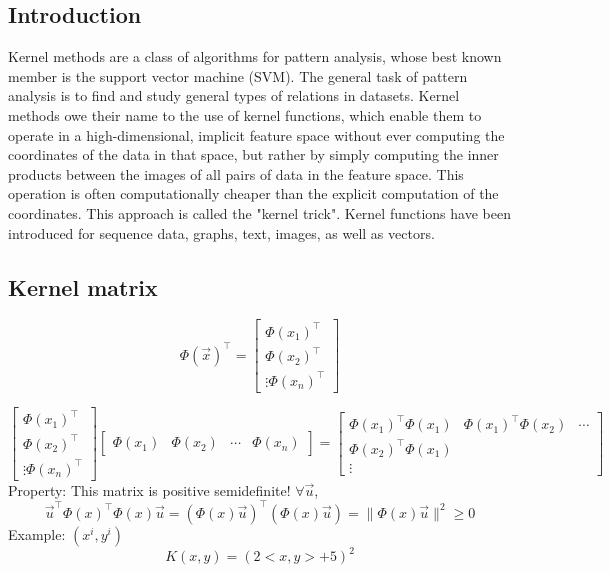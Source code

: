 \documentclass[18pt, oneside]{article}
\begin{document}
\begin{Large}
\subsection{Introduction}
Kernel methods are a class of algorithms for pattern analysis, whose best known member is the support vector machine (SVM). The general task of pattern analysis is to find and study general types of relations in datasets. Kernel methods owe their name to the use of kernel functions, which enable them to operate in a high-dimensional, implicit feature space without ever computing the coordinates of the data in that space, but rather by simply computing the inner products between the images of all pairs of data in the feature space. This operation is often computationally cheaper than the explicit computation of the coordinates. This approach is called the "kernel trick". Kernel functions have been introduced for sequence data, graphs, text, images, as well as vectors.
\subsection{Kernel matrix}
\begin{equation}
\Phi(\vec{x})^\top = 
\begin{bmatrix}
\Phi(x_{1})^\top\\
\Phi(x_{2})^\top\\
\vdots
\Phi(x_{n})^\top
\end{bmatrix}
\end{equation}

\begin{equation}
\begin{bmatrix}
\Phi(x_{1})^\top\\
\Phi(x_{2})^\top\\
\vdots
\Phi(x_{n})^\top
\end{bmatrix}
\begin{bmatrix}
\Phi(x_{1}) & \Phi(x_{2}) & \cdots & \Phi(x_{n})
\end{bmatrix}=
\begin{bmatrix}
\Phi(x_{1})^\top\Phi(x_{1}) & \Phi(x_{1})^\top\Phi(x_{2}) & \cdots \\
\Phi(x_{2})^\top\Phi(x_{1})\\
\vdots
\end{bmatrix}
\end{equation}
Property: This matrix is positive semidefinite! $\forall \vec{u}$, 
\begin{equation}
\vec{u}^\top\Phi(x)^\top\Phi(x)\vec{u} = (\Phi(x)\vec{u})^\top(\Phi(x)\vec{u}) = \|\Phi(x)\vec{u}\|^2 \geq 0
\end{equation}
Example: $(x^{i}, y^{i})$
\begin{equation}
K(x,y) = (2<x,y> + 5)^2
\end{equation}
\end{Large}
\end{document}
